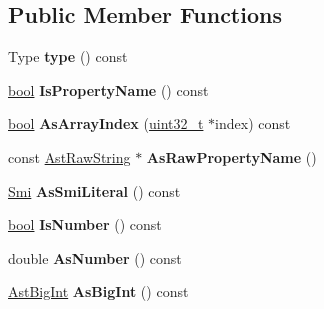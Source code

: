 \subsection*{Public Member Functions}
\begin{DoxyCompactItemize}
\item 
\mbox{\label{classv8_1_1internal_1_1Literal_aa5cdbce162b66bc4eea9c95f504e27ed}} 
Type {\bfseries type} () const
\item 
\mbox{\label{classv8_1_1internal_1_1Literal_ab801eee49b842399bd4180145e450869}} 
\mbox{\hyperlink{classbool}{bool}} {\bfseries Is\+Property\+Name} () const
\item 
\mbox{\label{classv8_1_1internal_1_1Literal_a0794e1a8d9d6ba7433c5a78d8c57ac69}} 
\mbox{\hyperlink{classbool}{bool}} {\bfseries As\+Array\+Index} (\mbox{\hyperlink{classuint32__t}{uint32\+\_\+t}} $\ast$index) const
\item 
\mbox{\label{classv8_1_1internal_1_1Literal_ab4b6e7f1adc1a307adf007c55d70a606}} 
const \mbox{\hyperlink{classv8_1_1internal_1_1AstRawString}{Ast\+Raw\+String}} $\ast$ {\bfseries As\+Raw\+Property\+Name} ()
\item 
\mbox{\label{classv8_1_1internal_1_1Literal_a51ab6c416bbe612a4c4faca7d2592f24}} 
\mbox{\hyperlink{classv8_1_1internal_1_1Smi}{Smi}} {\bfseries As\+Smi\+Literal} () const
\item 
\mbox{\label{classv8_1_1internal_1_1Literal_abb4c94e71c472cbfb953c5abe42244b9}} 
\mbox{\hyperlink{classbool}{bool}} {\bfseries Is\+Number} () const
\item 
\mbox{\label{classv8_1_1internal_1_1Literal_ad9b460a286873fb14efa5ac22ca75352}} 
double {\bfseries As\+Number} () const
\item 
\mbox{\label{classv8_1_1internal_1_1Literal_a8de2256ce6f0e6b287b00a2bcdfbb71f}} 
\mbox{\hyperlink{classv8_1_1internal_1_1AstBigInt}{Ast\+Big\+Int}} {\bfseries As\+Big\+Int} () const
\item 

\end{DoxyCompactItemize}
